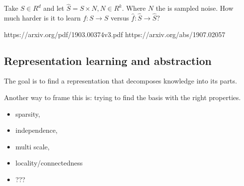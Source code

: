 Take \(S \in R^d\) and let \(\hat S = S \times N, N \in R^k\). Where
\(N\) the is sampled noise. How much harder is it to learn
\(f: S \to S\) versus \(\hat f: \hat S \to \hat S\)?

https://arxiv.org/pdf/1903.00374v3.pdf https://arxiv.org/abs/1907.02057

\hypertarget{representation-learning-and-abstraction}{%
\subsection{Representation learning and
abstraction}\label{representation-learning-and-abstraction}}

The goal is to find a representation that decomposes knowledge into its
parts.

Another way to frame this is: trying to find the basis with the right
properties.

\begin{itemize}
\tightlist
\item
  sparsity,
\item
  independence,
\item
  multi scale,
\item
  locality/connectedness
\item
  ???
\end{itemize}
